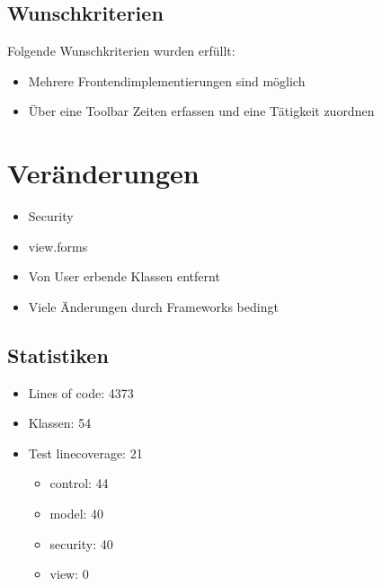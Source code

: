 \begin{frame}
	\subsection{Wunschkriterien}
	Folgende Wunschkriterien wurden erfüllt:
	\begin{itemize}
		\item Mehrere Frontendimplementierungen sind möglich
		\item Über eine Toolbar Zeiten erfassen und eine Tätigkeit zuordnen
	\end{itemize}
\end{frame}


\section{Veränderungen}
\begin{frame}
	\begin{itemize}
		\item Security
		\item view.forms
		\item Von User erbende Klassen entfernt
		\item Viele Änderungen durch Frameworks bedingt
	\end{itemize}
\end{frame}


\begin{frame}
	\section{Statistiken}
	\begin{itemize}
		\item Lines of code: 4373
		\item Klassen: 54
		\item Test linecoverage: 21%
		\begin{itemize}
			\item control: 44%
			\item model: 40%
			\item security: 40%
			\item view: 0%
		\end{itemize}
	\end{itemize}
\end{frame}




